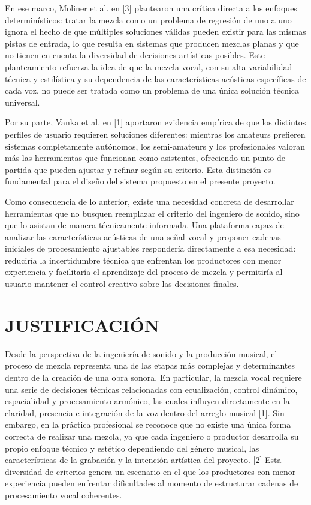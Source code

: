 \documentclass[12pt]{article}
\begin{document}
En ese marco, Moliner et al. en [3] plantearon una crítica directa a los enfoques determinísticos: tratar la mezcla como un problema de regresión de uno a uno ignora el hecho de que múltiples soluciones válidas pueden existir para las mismas pistas de entrada, lo que resulta en sistemas que producen mezclas planas y que no tienen en cuenta la diversidad de decisiones artísticas posibles. Este planteamiento refuerza la idea de que la mezcla vocal, con su alta variabilidad técnica y estilística y su dependencia de las características acústicas específicas de cada voz, no puede ser tratada como un problema de una única solución técnica universal.

Por su parte, Vanka et al. en [1] aportaron evidencia empírica de que los distintos perfiles de usuario requieren soluciones diferentes: mientras los amateurs prefieren sistemas completamente autónomos, los semi-amateurs y los profesionales valoran más las herramientas que funcionan como asistentes, ofreciendo un punto de partida que pueden ajustar y refinar según su criterio. Esta distinción es fundamental para el diseño del sistema propuesto en el presente proyecto.

Como consecuencia de lo anterior, existe una necesidad concreta de desarrollar herramientas que no busquen reemplazar el criterio del ingeniero de sonido, sino que lo asistan de manera técnicamente informada. Una plataforma capaz de analizar las características acústicas de una señal vocal y proponer cadenas iniciales de procesamiento ajustables respondería directamente a esa necesidad: reduciría la incertidumbre técnica que enfrentan los productores con menor experiencia y facilitaría el aprendizaje del proceso de mezcla y permitiría al usuario mantener el control creativo sobre las decisiones finales.

\section{JUSTIFICACIÓN}

Desde la perspectiva de la ingeniería de sonido y la producción musical, el proceso de mezcla representa una de las etapas más complejas y determinantes dentro de la creación de una obra sonora. En particular, la mezcla vocal requiere una serie de decisiones técnicas relacionadas con ecualización, control dinámico, espacialidad y procesamiento armónico, las cuales influyen directamente en la claridad, presencia e integración de la voz dentro del arreglo musical [1]. Sin embargo, en la práctica profesional se reconoce que no existe una única forma correcta de realizar una mezcla, ya que cada ingeniero o productor desarrolla su propio enfoque técnico y estético dependiendo del género musical, las características de la grabación y la intención artística del proyecto. [2] Esta diversidad de criterios genera un escenario en el que los productores con menor experiencia pueden enfrentar dificultades al momento de estructurar cadenas de procesamiento vocal coherentes.
\end{document}
